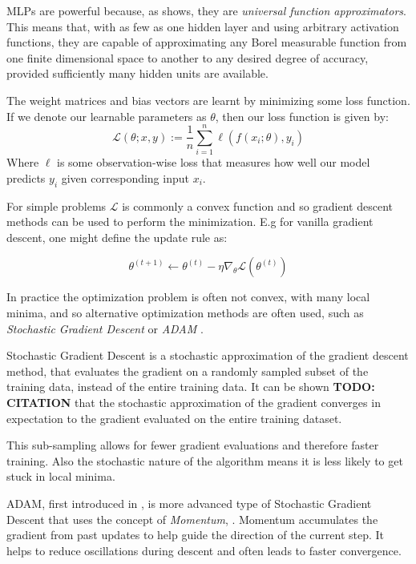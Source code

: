 \documentclass[a4paper, oneside, notitlepage]{book}
\begin{document}
MLPs are powerful because, as \cite{HORNIK1989} shows, they are \textit{universal function approximators}.
This means that, with as few as one hidden layer and using arbitrary activation functions, 
they are capable of approximating any Borel measurable function from one finite dimensional space 
to another to any desired degree of accuracy, provided sufficiently many hidden units are available.

The weight matrices and bias vectors are learnt by minimizing some loss function.
If we denote our learnable parameters as $\theta$, then our loss function is given by:
\begin{equation}
   \mathcal{L} (\theta; x, y) := \frac{1}{n} \sum_{i=1}^{n} \ell(f(x_i; \theta), y_i)
\end{equation}
Where $\ell$ is some observation-wise loss that measures how well our model predicts
$y_i$ given corresponding input $x_i$.

For simple problems $\mathcal{L}$ is commonly a convex function and so gradient descent methods can be
used to perform the minimization. E.g for vanilla gradient descent, one might define the update rule as:

\begin{equation}
    \theta^{(t+1)} \gets \theta^{(t)} - \eta \nabla_\theta \mathcal{L}(\theta^{(t)})
\end{equation}

In practice the optimization problem is often not convex, with many local minima, and so alternative optimization methods
are often used, such as \textit{Stochastic Gradient Descent} \cite{ROBBINS1951} or \textit{ADAM} \cite{ADAM2017}.

Stochastic Gradient Descent is a stochastic approximation of the gradient descent method, that
evaluates the gradient on a randomly sampled subset of the training data, instead of the entire training data.
It can be shown \textbf{TODO: CITATION} that the stochastic approximation of the gradient converges in expectation to
the gradient evaluated on the entire training dataset.

This sub-sampling allows for fewer gradient evaluations and therefore faster training. Also the stochastic
nature of the algorithm means it is less likely to get stuck in local minima.

ADAM, first introduced in \cite{ADAM2017}, is more advanced type of Stochastic Gradient Descent
that uses the concept of \textit{Momentum}, \cite{RUMELHART1986}. Momentum accumulates
the gradient from past updates to help guide the direction of the current step. It helps
to reduce oscillations during descent and often leads to faster convergence.
\end{document}
